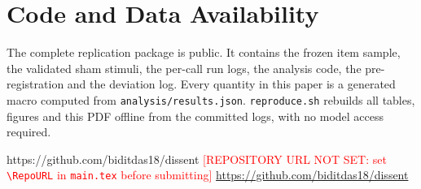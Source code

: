 \documentclass[conference]{IEEEtran}
\newif\ifanon
\newcommand{\RepoURL}{https://github.com/biditdas18/dissent}
\newcommand{\AnonURL}{https://anonymous.4open.science/r/dissent-E57D/README.md}
\begin{document}
\section*{Code and Data Availability}
The complete replication package is public. It contains the frozen item sample, the
validated sham stimuli, the per-call run logs, the analysis code, the
pre-registration and the deviation log. Every quantity in this paper is a generated
macro computed from \texttt{analysis/results.json}. \texttt{reproduce.sh} rebuilds all
tables, figures and this PDF offline from the committed logs, with no model access
required.
\ifanon
An anonymized mirror of the full repository is available for review at
\url{\AnonURL}.
\else
\ifx\RepoURL\empty
\textcolor{red}{[REPOSITORY URL NOT SET: set \texttt{\textbackslash RepoURL} in
\texttt{main.tex} before submitting]}
\else
\url{\RepoURL}
\fi
\fi



\end{document}
